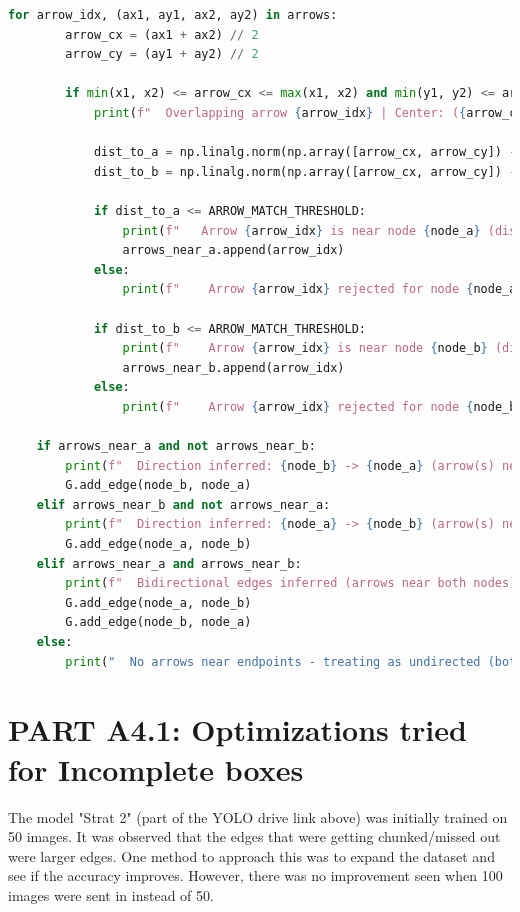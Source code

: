 \documentclass{article}
\begin{document}
\begin{lstlisting}[language=Python, caption=Debugs applied in the arrow logic to figure out issues]
    for arrow_idx, (ax1, ay1, ax2, ay2) in arrows:
        arrow_cx = (ax1 + ax2) // 2
        arrow_cy = (ay1 + ay2) // 2

        if min(x1, x2) <= arrow_cx <= max(x1, x2) and min(y1, y2) <= arrow_cy <= max(y1, y2):
            print(f"  Overlapping arrow {arrow_idx} | Center: ({arrow_cx},{arrow_cy})")

            dist_to_a = np.linalg.norm(np.array([arrow_cx, arrow_cy]) - np.array(corner_a))
            dist_to_b = np.linalg.norm(np.array([arrow_cx, arrow_cy]) - np.array(corner_b))

            if dist_to_a <= ARROW_MATCH_THRESHOLD:
                print(f"   Arrow {arrow_idx} is near node {node_a} (distance={dist_to_a:.1f} <= {ARROW_MATCH_THRESHOLD})")
                arrows_near_a.append(arrow_idx)
            else:
                print(f"    Arrow {arrow_idx} rejected for node {node_a} (distance={dist_to_a:.1f} > {ARROW_MATCH_THRESHOLD})")

            if dist_to_b <= ARROW_MATCH_THRESHOLD:
                print(f"    Arrow {arrow_idx} is near node {node_b} (distance={dist_to_b:.1f} <= {ARROW_MATCH_THRESHOLD})")
                arrows_near_b.append(arrow_idx)
            else:
                print(f"    Arrow {arrow_idx} rejected for node {node_b} (distance={dist_to_b:.1f} > {ARROW_MATCH_THRESHOLD})")

    if arrows_near_a and not arrows_near_b:
        print(f"  Direction inferred: {node_b} -> {node_a} (arrow(s) near node {node_a} only)")
        G.add_edge(node_b, node_a)
    elif arrows_near_b and not arrows_near_a:
        print(f"  Direction inferred: {node_a} -> {node_b} (arrow(s) near node {node_b} only)")
        G.add_edge(node_a, node_b)
    elif arrows_near_a and arrows_near_b:
        print(f"  Bidirectional edges inferred (arrows near both nodes)")
        G.add_edge(node_a, node_b)
        G.add_edge(node_b, node_a)
    else:   
        print("  No arrows near endpoints - treating as undirected (both ways)")
\end{lstlisting}

\section{PART A4.1: Optimizations tried for Incomplete boxes}

The model "Strat 2" (part of the YOLO drive link above) was initially trained on 50 images. It was observed that the edges that were getting chunked/missed out were larger edges. One method to approach this was to expand the dataset and see if the accuracy improves. However, there was no improvement seen when 100 images were sent in instead of 50. 
\end{document}
